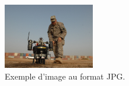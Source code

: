 \begin{figure}[htp]
  \centering
  \includegraphics[width=4cm]{images/bitmap_image}
  \caption{Exemple d'image au format JPG.}
  \label{fig:une-autre-image}
\end{figure}


